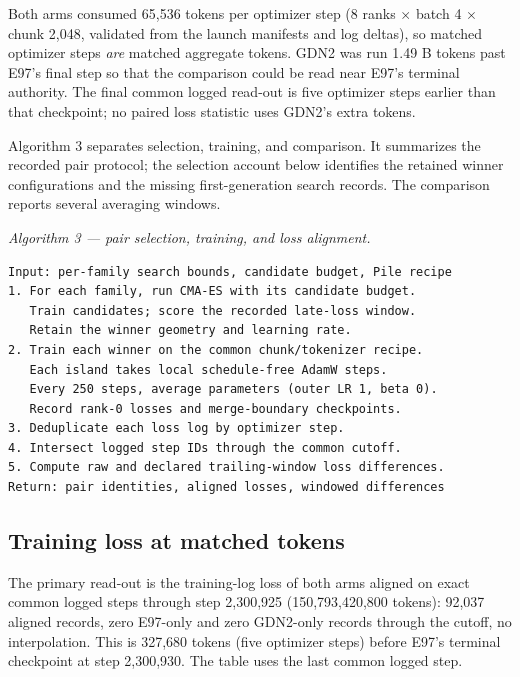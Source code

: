 \documentclass[10pt]{article}
\theoremstyle{canonical}
\theoremstyle{canonicalbullet}
\begin{document}
Both arms consumed 65,536 tokens per optimizer step (8 ranks $\times $ batch 4 $\times $ chunk 2,048, validated from the launch manifests and log deltas), so matched optimizer steps \emph{are} matched aggregate tokens. GDN2 was run 1.49 B tokens past E97's final step so that the comparison could be read near E97's terminal authority. The final common logged read-out is five optimizer steps earlier than that checkpoint; no paired loss statistic uses GDN2's extra tokens.

Algorithm 3 separates selection, training, and comparison. It summarizes the recorded pair protocol; the selection account below identifies the retained winner configurations and the missing first-generation search records. The comparison reports several averaging windows.

\emph{Algorithm 3 --- pair selection, training, and loss alignment.}
\begin{verbatim}
Input: per-family search bounds, candidate budget, Pile recipe
1. For each family, run CMA-ES with its candidate budget.
   Train candidates; score the recorded late-loss window.
   Retain the winner geometry and learning rate.
2. Train each winner on the common chunk/tokenizer recipe.
   Each island takes local schedule-free AdamW steps.
   Every 250 steps, average parameters (outer LR 1, beta 0).
   Record rank-0 losses and merge-boundary checkpoints.
3. Deduplicate each loss log by optimizer step.
4. Intersect logged step IDs through the common cutoff.
5. Compute raw and declared trailing-window loss differences.
Return: pair identities, aligned losses, windowed differences
\end{verbatim}



\subsection*{Training loss at matched tokens}


The primary read-out is the training-log loss of both arms aligned on exact common logged steps through step 2,300,925 (150,793,420,800 tokens): 92,037 aligned records, zero E97-only and zero GDN2-only records through the cutoff, no interpolation. This is 327,680 tokens (five optimizer steps) before E97's terminal checkpoint at step 2,300,930. The table uses the last common logged step.
\end{document}
